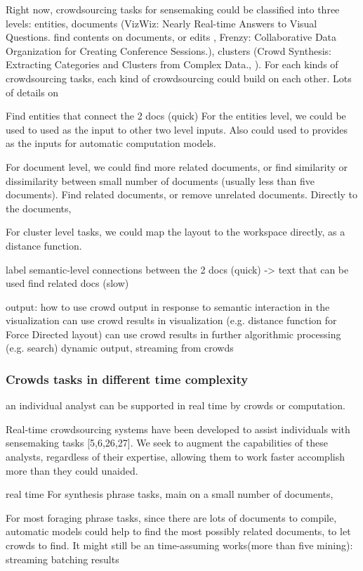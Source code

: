\documentclass[journal]{vgtc}                %
\begin{document}
Right now, crowdsourcing tasks for sensemaking could be classified into three levels: entities, documents (VizWiz: Nearly Real-time Answers to Visual Questions.
find contents on documents, or edits , Frenzy: Collaborative Data Organization for Creating Conference Sessions.),
clusters (Crowd Synthesis: Extracting Categories and Clusters from Complex Data.,  ). For each kinds of crowdsourcing tasks, each kind of crowdsourcing could build on each other.
Lots of details on

Find entities that connect the 2 docs (quick)
For the entities level, we could be used to used as the input to other two level inputs. Also could used to provides as the inputs for automatic computation models.

For document level, we could find more related documents, or find similarity or dissimilarity between small number of documents (usually less than five documents). Find related documents, or remove unrelated documents. Directly to the documents,

For cluster level tasks, we could map the layout to the workspace directly, as a distance function.

label semantic-level connections between the 2 docs (quick) -> text that can be used
find related docs (slow)

output:  how to use crowd output in response to semantic interaction in the visualization
can use crowd results in visualization (e.g. distance function for Force Directed layout)
can use crowd results in further algorithmic processing (e.g. search)
dynamic output, streaming from crowds

\subsubsection{Crowds tasks in different time complexity}

an individual analyst can be supported in real time by crowds or computation.

Real-time crowdsourcing systems have been developed to assist individuals with sensemaking tasks [5,6,26,27].
We seek to augment the capabilities of these analysts, regardless of their expertise, allowing them to work faster accomplish more than they could unaided.

real time
For synthesis phrase tasks, main on a small number of documents,

For most foraging phrase tasks, since there are lots of documents to compile, automatic models could help to find the most possibly related documents, to let crowds to find. It might still be an time-assuming works(more than five mining):
streaming
batching results
\end{document}
